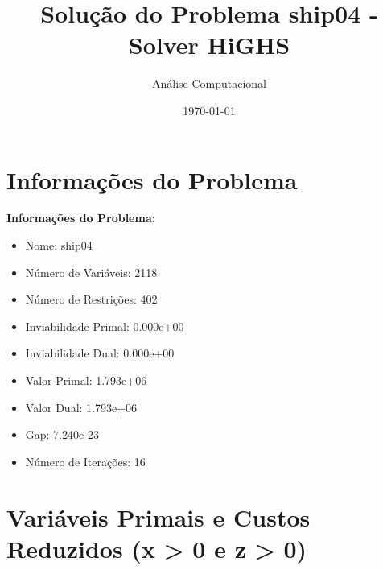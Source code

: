\documentclass[12pt]{article}
\title{Solução do Problema ship04 - Solver HiGHS}
\author{Análise Computacional}
\date{\today}
\begin{document}
\maketitle

\section{Informações do Problema}

\textbf{Informações do Problema:}
\begin{itemize}
\item Nome: ship04
\item Número de Variáveis: 2118
\item Número de Restrições: 402
\item Inviabilidade Primal: 0.000e+00
\item Inviabilidade Dual: 0.000e+00
\item Valor Primal: 1.793e+06
\item Valor Dual: 1.793e+06
\item Gap: 7.240e-23
\item Número de Iterações: 16
\end{itemize}


\section{Variáveis Primais e Custos Reduzidos (x > 0 e z > 0)}
\end{document}
